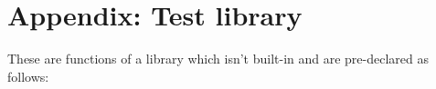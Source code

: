 \section*{Appendix: Test library}

These are functions of a library which isn't built-in and are pre-declared as follows:


